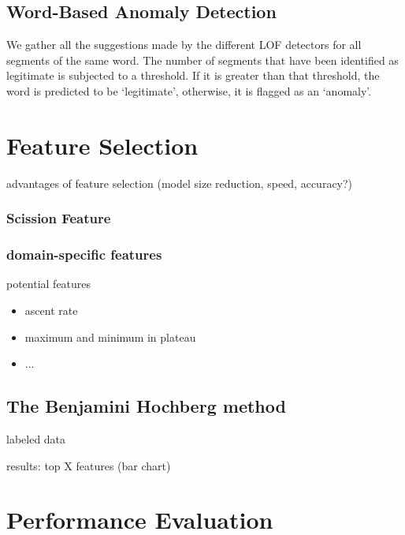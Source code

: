 \documentclass[conference]{IEEEtran}
\begin{document}
\subsection{Word-Based Anomaly Detection}
  We gather all the suggestions made by the different LOF detectors for all segments of the same word. The number of segments that have been identified as legitimate is subjected to a threshold. If it is greater than that threshold, the word is predicted to be `legitimate', otherwise, it is flagged as an `anomaly'.
  



\section{Feature Selection}

  \color{gray}
  advantages of feature selection (model size reduction, speed, accuracy?)
  \color{black}


\subsubsection{Scission Feature}

  \cite{kneib2018scission}

\subsubsection{domain-specific features}
  potential features
  \begin{itemize}
    \item ascent rate
    \item maximum and minimum in plateau
    \item ...
  \end{itemize}
 
 \subsection{The Benjamini Hochberg method}
 
 \cite{benjamini1995controlling}
 
  labeled data
 
  results: top X features  (bar chart)

\section{Performance Evaluation}
\end{document}
